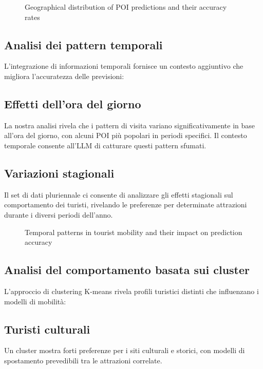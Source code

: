 \begin{figure}[H]
\centering
\caption{Geographical distribution of POI predictions and their accuracy rates}
\label{fig:geographical_analysis}
\end{figure}

\subsection{Analisi dei pattern temporali}

L'integrazione di informazioni temporali fornisce un contesto aggiuntivo che migliora l'accuratezza delle previsioni:

\subsection{Effetti dell'ora del giorno}
La nostra analisi rivela che i pattern di visita variano significativamente in base all'ora del giorno, con alcuni POI più popolari in periodi specifici. Il contesto temporale consente all'LLM di catturare questi pattern sfumati.

\subsection{Variazioni stagionali}
Il set di dati pluriennale ci consente di analizzare gli effetti stagionali sul comportamento dei turisti, rivelando le preferenze per determinate attrazioni durante i diversi periodi dell'anno.

\begin{figure}[H]
\centering
\caption{Temporal patterns in tourist mobility and their impact on prediction accuracy}
\label{fig:temporal_analysis}
\end{figure}

\subsection{Analisi del comportamento basata sui cluster}

L'approccio di clustering K-means rivela profili turistici distinti che influenzano i modelli di mobilità:

\subsection{Turisti culturali}
Un cluster mostra forti preferenze per i siti culturali e storici, con modelli di spostamento prevedibili tra le attrazioni correlate.


